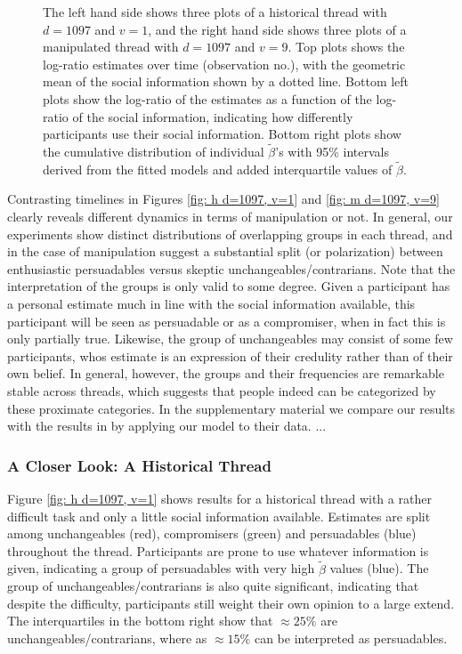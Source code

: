 \documentclass[9pt,twocolumn,twoside,lineno]{pnas-new}
\begin{document}
\begin{figure}[!ht]
\begin{subfigure}[t]{.1\linewidth}
	\end{subfigure}
	\caption{The left hand side shows three plots of a historical thread with $d=1097$ and $v=1$, and the right hand side shows three plots of a manipulated thread with $d=1097$ and $v=9$. Top plots shows the log-ratio estimates over time (observation no.), with the geometric mean of the social information shown by a dotted line. Bottom left plots show the log-ratio of the estimates as a function of the log-ratio of the social information, indicating how differently participants use their social information. Bottom right plots show the cumulative distribution of individual $\tilde{\beta}$'s with 95\% intervals derived from the fitted models and added interquartile values of $\tilde{\beta}$.}
	\label{fig: social influence}
\end{figure}

Contrasting timelines in Figures \ref{fig: h d=1097, v=1} and \ref{fig: m d=1097, v=9} clearly reveals different dynamics in terms of manipulation or not. In general, our experiments show distinct distributions of overlapping groups in each thread, and in the case of manipulation suggest a substantial split (or polarization) between enthusiastic persuadables versus skeptic unchangeables/contrarians. Note that the interpretation of the groups is only valid to some degree. Given a participant has a personal estimate much in line with the social information available, this participant will be seen as persuadable or as a compromiser, when in fact this is only partially true. Likewise, the group of unchangeables may consist of some few participants, whos estimate is an expression of their credulity rather than of their own belief. In general, however, the groups and their frequencies are remarkable stable across threads, which suggests that people indeed can be categorized by these proximate categories. In the supplementary material we compare our results with the results in \citet{jayles2017social} by applying our model to their data. ...

\subsubsection*{A Closer Look: A Historical Thread}
Figure \ref{fig: h d=1097, v=1} shows results for a historical thread with a rather difficult task and only a little social information available. Estimates are split among unchangeables (red), compromisers (green) and persuadables (blue) throughout the thread. Participants are prone to use whatever information is given, indicating a group of persuadables with very high $\tilde{\beta}$ values (blue). The group of unchangeables/contrarians is also quite significant, indicating that despite the difficulty, participants still weight their own opinion to a large extend. The interquartiles in the bottom right show that $\approx25\%$ are unchangeables/contrarians, where as $\approx15\%$ can be interpreted as persuadables.
\end{document}

